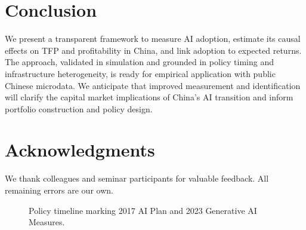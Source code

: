 \section{Conclusion}
We present a transparent framework to measure AI adoption, estimate its causal effects on TFP and profitability in China, and link adoption to expected returns. The approach, validated in simulation and grounded in policy timing and infrastructure heterogeneity, is ready for empirical application with public Chinese microdata. We anticipate that improved measurement and identification will clarify the capital market implications of China’s AI transition and inform portfolio construction and policy design.

\section*{Acknowledgments}
We thank colleagues and seminar participants for valuable feedback. All remaining errors are our own.

\begin{figure}[h]
\centering
{}
\caption{Policy timeline marking 2017 AI Plan and 2023 Generative AI Measures.}
\label{fig:timeline}
\end{figure}

\appendix

